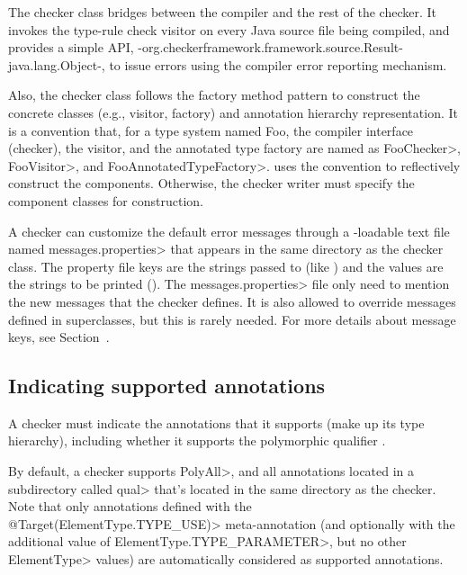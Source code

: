 The checker class bridges between the compiler and the rest of the checker.  It
invokes the type-rule check visitor on every Java source file being
compiled, and provides a simple API,
{-org.checkerframework.framework.source.Result-java.lang.Object-}, to issue
errors using the compiler error reporting mechanism.

Also, the checker class follows the factory method pattern to
construct the concrete classes (e.g., visitor, factory) and annotation
hierarchy representation.  It is a convention that, for
a type system named Foo, the compiler
interface (checker), the visitor, and the annotated type factory are
named as \<FooChecker>, \<FooVisitor>, and \<FooAnnotatedTypeFactory>.
 uses the convention to
reflectively construct the components.  Otherwise, the checker writer
must specify the component classes for construction.

\begin{sloppypar}
A checker can customize the default error messages through a
-loadable text file named
\<messages.properties> that appears in the same directory as the checker class.
The property file keys are the strings passed to 
(like ) and the values are the strings to be
printed ().
The \<messages.properties> file only need to mention the new messages that
the checker defines.
It is also allowed to override messages defined in superclasses, but this
is rarely needed.
For more details about message keys, see Section~.
\end{sloppypar}

\subsection{Indicating supported annotations\label{indicating-supported-annotations}}

A checker must indicate the annotations that it supports (make up its type
hierarchy), including whether it supports the polymorphic qualifier
.

By default, a checker supports \<PolyAll>, and all annotations located in a
subdirectory called \<qual> that's located in the same directory as the checker.
Note that only annotations defined with the \<@Target({ElementType.TYPE\_USE})>
meta-annotation (and optionally with the additional value of
\<ElementType.TYPE\_PARAMETER>, but no other \<ElementType> values)
are automatically considered as supported annotations.

